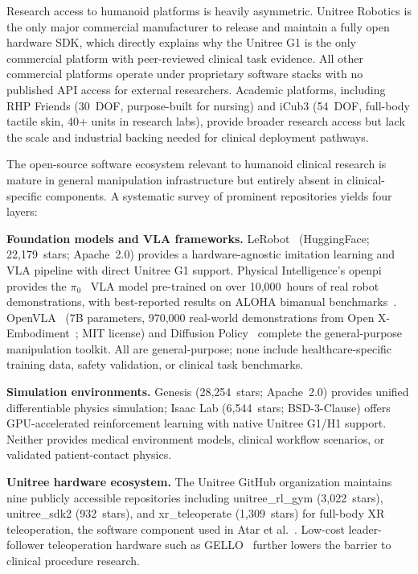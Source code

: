 \documentclass[acmsmall]{acmart}
\begin{document}
Research access to humanoid platforms is heavily asymmetric. Unitree Robotics
is the only major commercial manufacturer to release and maintain a fully open
hardware SDK, which directly explains why the Unitree G1 is the only commercial
platform with peer-reviewed clinical task evidence. All other commercial platforms
operate under proprietary software stacks with no published API access for
external researchers. Academic platforms, including RHP Friends (30~DOF, purpose-built
for nursing) and iCub3 (54~DOF, full-body tactile skin, 40+ units in research
labs), provide broader research access but lack the scale and industrial backing
needed for clinical deployment pathways.

The open-source software ecosystem relevant to humanoid clinical research is
mature in general manipulation infrastructure but entirely absent in clinical-specific
components. A systematic survey of prominent repositories yields four layers:

\textbf{Foundation models and VLA frameworks.} LeRobot~\cite{cadene2024lerobot}
(HuggingFace; 22,179~stars; Apache~2.0) provides a hardware-agnostic imitation
learning and VLA pipeline with direct Unitree G1 support. Physical Intelligence's
openpi provides the $\pi_0$~\cite{black2024pi0} VLA model pre-trained on over
10,000~hours of real robot demonstrations, with best-reported results on ALOHA
bimanual benchmarks~\cite{zhao2023act}. OpenVLA~\cite{kim2024openvla} (7B parameters,
970,000 real-world demonstrations from Open X-Embodiment~\cite{openxembodiment2023};
MIT license) and Diffusion Policy~\cite{chi2023diffusion} complete the general-purpose
manipulation toolkit. All are general-purpose; none include healthcare-specific
training data, safety validation, or clinical task benchmarks.

\textbf{Simulation environments.} Genesis (28,254~stars; Apache~2.0) provides
unified differentiable physics simulation; Isaac Lab (6,544~stars; BSD-3-Clause)
offers GPU-accelerated reinforcement learning with native Unitree G1/H1 support.
Neither provides medical environment models, clinical workflow scenarios, or
validated patient-contact physics.

\textbf{Unitree hardware ecosystem.} The Unitree GitHub organization maintains
nine publicly accessible repositories including unitree\_rl\_gym (3,022~stars),
unitree\_sdk2 (932~stars), and xr\_teleoperate (1,309~stars) for full-body
XR teleoperation, the software component used in Atar et al.~\cite{atar2025humanoids}.
Low-cost leader-follower teleoperation hardware such as GELLO~\cite{wu2023gello}
further lowers the barrier to clinical procedure research.
\end{document}
